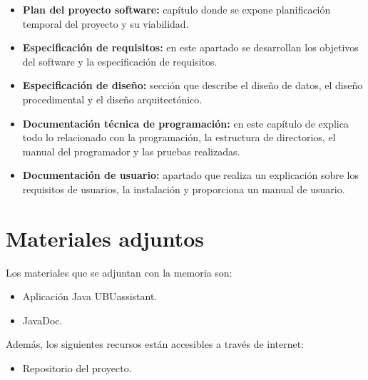 \begin{itemize}
\tightlist
\item
  \textbf{Plan del proyecto software:} capítulo donde se expone planificación temporal del proyecto y su viabilidad.
\item
  \textbf{Especificación de requisitos:} en este apartado se desarrollan los objetivos del software y la especificación de requisitos.
\item
  \textbf{Especificación de diseño:} sección que describe el diseño de datos, el diseño procedimental y el diseño arquitectónico.
\item
  \textbf{Documentación técnica de programación:} en este capítulo de explica todo lo relacionado con la programación, la estructura de directorios, el manual del programador y las pruebas realizadas.
\item
  \textbf{Documentación de usuario:} apartado que realiza un explicación sobre los requisitos de usuarios, la instalación y proporciona un manual de usuario.
\end{itemize}

\section{Materiales adjuntos}\label{materiales-adjuntos}

Los materiales que se adjuntan con la memoria son: 

\begin{itemize}
\tightlist
\item
	Aplicación Java UBUassistant.
\item	
	JavaDoc.
\end{itemize}

Además, los siguientes recursos están accesibles a través de internet:

\begin{itemize}
\tightlist
\item
  Repositorio del proyecto.
\end{itemize}

